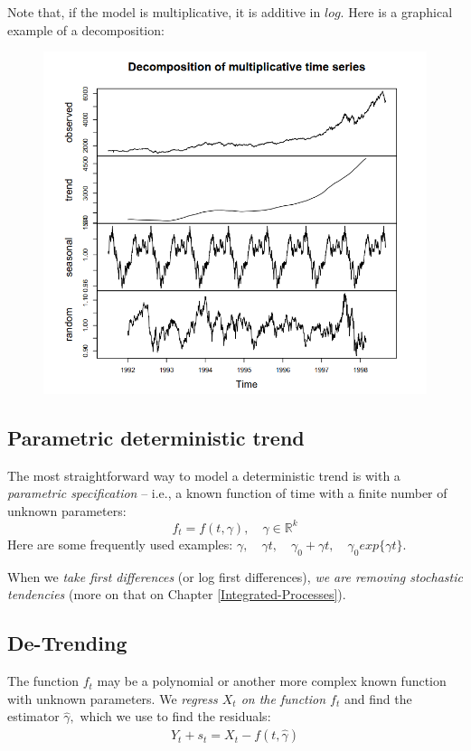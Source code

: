\documentclass[11pt, a4paper]{report}
\theoremstyle{plain}
\theoremstyle{plain}
\theoremstyle{remark}
\begin{document}
Note that, if the model is multiplicative, it is additive in $log$. Here is a graphical example of a decomposition:

\begin{figure}
	\centering
	\includegraphics[width=0.6\linewidth]{"decomposition multiplicative ts"}
	\label{fig:decomposition-multiplicative-ts}
\end{figure}

\subsection{Parametric deterministic trend}

The most straightforward way to model a deterministic trend is with a \textit{parametric specification} -- i.e., a known function of time with a finite number of unknown parameters:
$$ f_t = f(t, \gamma), \hspace{1em} \gamma \in \mathbb{R}^k $$
Here are some frequently used examples: $\gamma, \hspace{1em} \gamma t, \hspace{1em} \gamma_0 + \gamma t, \hspace{1em} \gamma_0 exp \{ \gamma t \}$.

When we \textit{take first differences} (or log first differences), \textit{we are removing stochastic tendencies} (more on that on Chapter \ref{Integrated-Processes}).

\subsection{De-Trending}

The function $f_t$ may be a polynomial or another more complex known function with unknown parameters. We \textit{regress $X_t$ on the function $f_t$} and find the estimator $\hat{\gamma},$ which we use to find the residuals:
$$ \hat{Y}_t + s_t = X_t - f(t, \hat{\gamma}) $$
\end{document}
